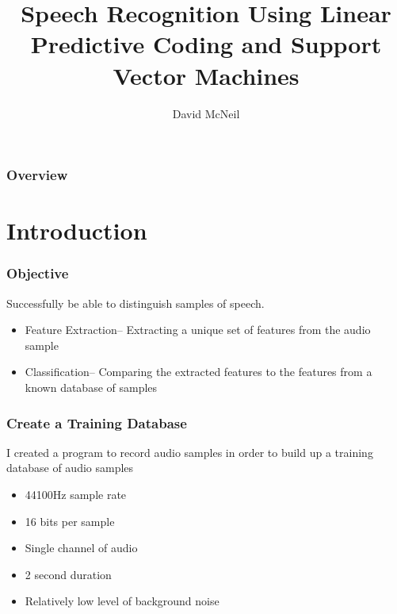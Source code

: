 \documentclass{beamer}
\title[Speech Recognition]{Speech Recognition Using Linear Predictive Coding and Support Vector Machines}
\author{David McNeil} %
\institute[RHIT] %
{
Rose-Hulman Institute of Technology \\ %
\medskip
\textit{mcneilde@rose-hulman.edu} %
}
\date{}
\begin{document}
\begin{frame}
\titlepage
\end{frame}

\begin{frame}
\frametitle{Overview}
\tableofcontents %
\end{frame}

\section{Introduction} 

\begin{frame}
\frametitle{Objective}
\begin{block}{Successfully be able to distinguish samples of speech.}
\begin{itemize}
	\item Feature Extraction-- Extracting a unique set of features from the audio sample
	\item Classification-- Comparing the extracted features to the features from a known database of samples
\end{itemize}
\end{block}
\end{frame}


\begin{frame}
\frametitle{Create a Training Database}
\begin{block}{I created a program to record audio samples in order to build up a training database of audio samples}
\begin{itemize}
	\item 44100Hz sample rate
	\item 16 bits per sample
	\item Single channel of audio
	\item 2 second duration %
	\item Relatively low level of background noise
\end{itemize}
\end{block}
\end{frame}
\end{document}
